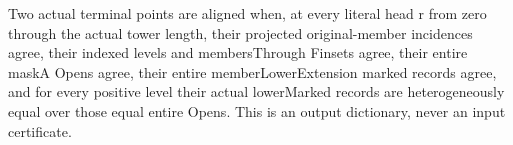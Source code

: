 \begin{definition}
\label{hir:member-head-incidence-whole-alignment}
\leanok
{}
Two actual terminal points are aligned when, at every literal head r from
zero through the actual tower length, their projected original-member
incidences agree, their indexed levels and membersThrough Finsets agree,
their entire maskA Opens agree, their entire memberLowerExtension marked
records agree, and for every positive level their actual lowerMarked records
are heterogeneously equal over those equal entire Opens. This is an output
dictionary, never an input certificate.
\end{definition}

